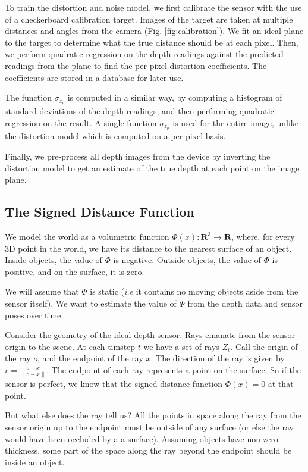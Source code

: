\documentclass[10pt,twocolumn,letterpaper]{article}
\begin{document}
 To train the distortion and noise model, we first calibrate the sensor with the
 use of a checkerboard calibration target. Images of the target are taken at
 multiple distances and angles from the camera (Fig. \ref{fig:calibration}). We
 fit an ideal plane to the target to determine what the true distance should be
 at each pixel. Then, we perform quadratic regression on the depth readings
 against the predicted readings from the plane to find the per-pixel distortion
 coefficients. The coefficients are stored in a database for later use.

The function $\sigma_{z_p}$ is computed in a similar way, by computing a
histogram of standard deviations of the depth readings, and then performing
quadratic regression on the result. A single function $\sigma_{z_p}$ is used for
the entire image, unlike the distortion model which is computed on a per-pixel
basis.

Finally, we pre-process all depth images from the device by inverting the
distortion model to get an estimate of the true depth at each point on the
image plane.

\subsection{The Signed Distance Function}
We model the world as a volumetric function $\Phi(x) : \mathbf{R}^3 \to
\mathbf{R}$, where, for every 3D point in the world, we have its distance to the
nearest surface of an object. Inside objects, the value of $\Phi$ is negative.
Outside objects, the value of $\Phi$ is positive, and on the surface, it is
zero.

 We will assume that $\Phi$ is static (\textit{i.e} it contains no moving
 objects aside from the sensor itself). We want to estimate the value of $\Phi$
 from the depth data and sensor poses over time.

Consider the geometry of the ideal depth sensor. Rays emanate from the sensor
origin to the scene. At each timstep $t$ we have a set of rays $Z_t$. Call the
origin of the ray $o$, and the endpoint of the ray $x$. The direction of the
ray is given by $r = \frac{o - x}{\|o - x\|}$. The endpoint of each ray
represents a point on the surface. So if  the sensor is perfect, we know that
the signed distance function $\Phi(x) = 0$ at that point.

But what else does the ray tell us? All the points in space along the ray from
the sensor origin up to the endpoint must be outside of any surface (or else the
ray would have been occluded by a a surface). Assuming objects have non-zero
thickness, some part of the space along the ray beyond the endpoint should be
inside an object. 
\end{document}
